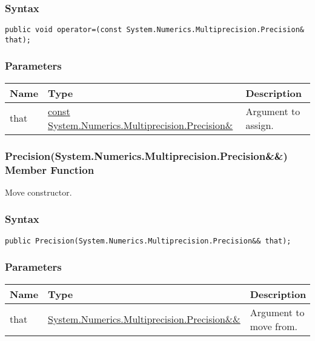 \documentclass[a4paper,oneside,11.000000pt]{book}
\begin{document}
\subsubsection*{Syntax}
\texttt{public void operator=(const System.Numerics.Multiprecision.Precision\& that);}
\subsubsection*{Parameters}
\begin{flushleft}
\begin{supertabular}[l]{!{\raggedright}p{1.30721cm}!{\raggedright}p{8.55945cm}!{\raggedright}p{4.89046cm}}
\textbf{Name}
& \textbf{Type}
& \textbf{Description}
\\
\hline
that
& \hyperlink{System.Numerics.Multiprecision.Precision}{const System.\-Numerics.\-Multiprecision.\-Precision\&\-}
& Argument to assign.

\\
\end{supertabular}

\end{flushleft}
\clearpage

\hypertarget{System.Numerics.Multiprecision.Precision.constructor.P.System.Numerics.Multiprecision.Precision.RR.System.Numerics.Multiprecision.Precision}{\subsubsection*{Precision(System.Numerics.Multiprecision.Precision\&\&) Member Function}}\begin{flushleft}
Move constructor.

\end{flushleft}
\subsubsection*{Syntax}
\texttt{public Precision(System.Numerics.Multiprecision.Precision\&\& that);}
\subsubsection*{Parameters}
\begin{flushleft}
\begin{supertabular}[l]{!{\raggedright}p{1.30721cm}!{\raggedright}p{8.55945cm}!{\raggedright}p{4.93333cm}}
\textbf{Name}
& \textbf{Type}
& \textbf{Description}
\\
\hline
that
& \hyperlink{System.Numerics.Multiprecision.Precision}{System.\-Numerics.\-Multiprecision.\-Precision\&\-\&\-}
& Argument to move from.

\\
\end{supertabular}

\end{flushleft}
\clearpage
\end{document}
